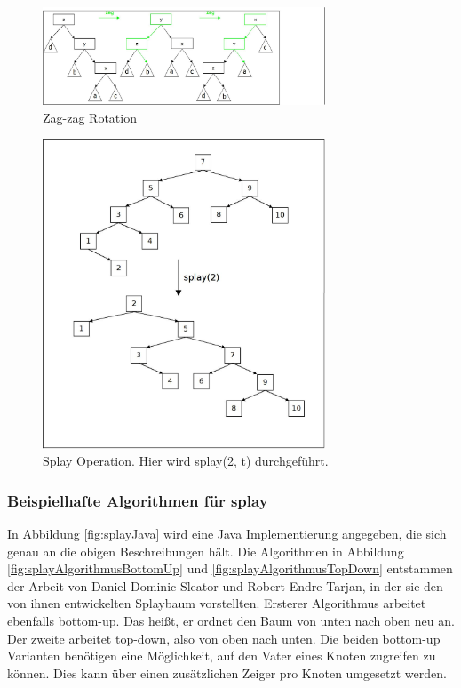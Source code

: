\documentclass[11pt, a4paper]{article}
\begin{document}
	
	\begin{figure}[h]
		\centering
		\includegraphics[width=0.75\textwidth]{"bilder/zagZagRotation"}
		\caption{Zag-zag Rotation}
		\label{fig:zagZagRotation}
	\end{figure}
	\begin{figure}[h]
		\centering
		\includegraphics[width=0.75\textwidth]{"bilder/splayGesamt"}
		\caption{Splay Operation. Hier wird splay(2, t) durchgeführt. }
		\label{fig:splayGesamt}
	\end{figure}
	\subsubsection{Beispielhafte Algorithmen für splay}
	In Abbildung  \ref{fig:splayJava} wird eine Java Implementierung angegeben, die sich genau an die obigen Beschreibungen hält.
	\noindent Die Algorithmen in Abbildung \ref{fig:splayAlgorithmusBottomUp} und \ref{fig:splayAlgorithmusTopDown}  entstammen der Arbeit \cite{sl1} von Daniel Dominic Sleator und  Robert Endre Tarjan, in der sie den von ihnen entwickelten Splaybaum vorstellten. Ersterer Algorithmus arbeitet ebenfalls bottom-up. Das heißt, er ordnet den Baum von unten nach oben neu an. Der zweite arbeitet top-down, also von oben nach unten. Die beiden bottom-up Varianten benötigen eine Möglichkeit, auf den Vater eines Knoten zugreifen zu können. Dies kann über einen zusätzlichen Zeiger pro Knoten umgesetzt werden.
	
\end{document}

